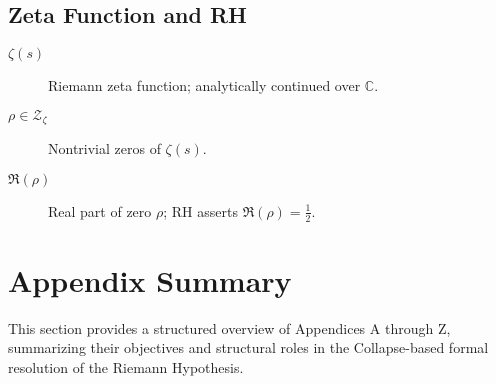 \documentclass[11pt]{article}
\begin{document}
\subsection*{Zeta Function and RH}

\begin{description}
  \item[$\zeta(s)$] Riemann zeta function; analytically continued over $\mathbb{C}$.
  \item[$\rho \in \mathcal{Z}_\zeta$] Nontrivial zeros of $\zeta(s)$.
  \item[$\Re(\rho)$] Real part of zero $\rho$; RH asserts $\Re(\rho) = \tfrac{1}{2}$.
\end{description}



\section*{Appendix Summary}

This section provides a structured overview of Appendices A through Z, summarizing their objectives and structural roles in the Collapse-based formal resolution of the Riemann Hypothesis.
\end{document}
